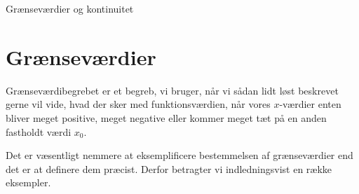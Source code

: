 
\begin{center}
	\Huge
	Grænseværdier og kontinuitet
\end{center}

\section*{Grænseværdier}

Grænseværdibegrebet er et begreb, vi bruger, når vi sådan lidt løst beskrevet gerne vil vide, hvad der sker med  funktionsværdien, når vores $x$-værdier enten bliver meget positive, meget negative eller kommer meget tæt på en anden fastholdt værdi $x_0$. 

Det er væsentligt nemmere at eksemplificere bestemmelsen af grænseværdier end det er at definere dem præcist. Derfor betragter vi indledningsvist en række eksempler.

